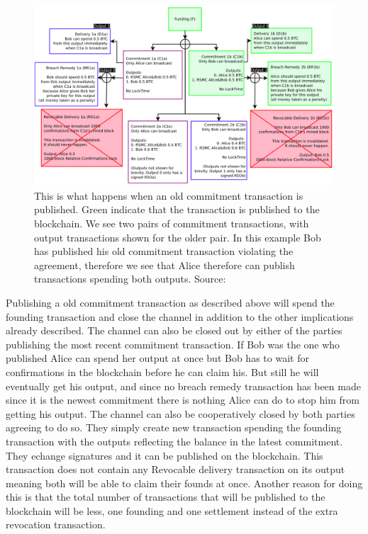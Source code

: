 \documentclass[informationsecurity]{gucmasterproject}
\begin{document}
\begin{figure}[h]
    \centering
    \includegraphics[width=14cm]{figs/ln_breach.png}
    \caption{This is what happens when an old commitment transaction is published. Green indicate that the transaction is published to the blockchain. We see two pairs of commitment transactions, with output transactions shown for the older pair. In this example Bob has published his old commitment transaction violating the agreement, therefore we see that Alice therefore can publish transactions spending both outputs.   Source: \cite{poon2015bitcoin}}
    \label{fig:ln_breach}
\end{figure}

Publishing a old commitment transaction as described above will spend the founding transaction and close the channel in addition to the other implications already described.
The channel can also be closed out by either of the parties publishing the most recent commitment transaction. If Bob was the one who published Alice can spend her output at once but Bob has to wait for confirmations in the blockchain before he can claim his. But still he will eventually get his output, and since no breach remedy transaction has been made since it is the newest commitment there is nothing Alice can do to stop him from getting his output.
The channel can also be cooperatively closed by both parties agreeing to do so. They simply create new transaction spending the founding transaction with the outputs reflecting the balance in the latest commitment. They echange signatures and it can be published on the blockchain. This transaction does not contain any Revocable delivery transaction on its output meaning both will be able to claim their founds at once. 
Another reason for doing this is that the total number of transactions that will be published to the blockchain will be less, one founding and one settlement instead of the extra revocation transaction.
\end{document}
